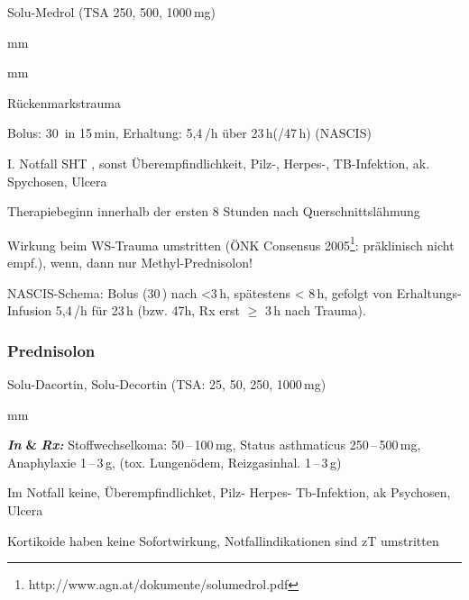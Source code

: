 Solu-Medrol (TSA 250, 500, 1000\,mg)
\begin{labeling}[:]{mm}
  \item[Beschreibung:]
  \item[In]
  \item[KI:]
  \item[Präparate:]
\end{labeling}
\begin{labeling}[:]{mm}\item[In] \item[KI] Rückenmarkstrauma

\item[Rx] Bolus: 30\, in 15\,min, Erhaltung:
5,4\,/h über 23\,h(/47\,h) (NASCIS)

\item[KI]  I. Notfall SHT%
, sonst Überempfindlichkeit, Pilz-, Herpes-, TB-Infektion, ak.
Spychosen, Ulcera

Therapiebeginn innerhalb der ersten 8 Stunden nach Querschnittslähmung


Wirkung beim WS-Trauma umstritten (ÖNK Consensus
2005\footnote{http://www.agn.at/dokumente/solumedrol.pdf}:  präklinisch nicht
empf.), wenn, dann nur Methyl-Prednisolon!

NASCIS-Schema: Bolus (30\,) nach {\textless}3\,h, spätestens
{\textless} 8\,h, gefolgt von Erhaltungs-Infusion 5,4\,/h für
23\,h (bzw. 47h, Rx erst ${\geq}$ 3\,h nach Trauma).


\end{labeling}

\subsubsection{Prednisolon}

Solu-Dacortin, Solu-Decortin (TSA: 25, 50, 250, 1000\,mg)
\begin{labeling}[:]{mm}
  \item[Beschreibung:]
  \item[In]
  \item[KI:]
  \item[Präparate:]


\textbf{\textit{\textcolor[rgb]{0.0,0.5019608,0.0}{In}}}\textbf{ \&
}\textbf{\textit{Rx:
}}\textcolor[rgb]{0.0,0.5019608,0.0}{Stoffwechselkoma:} 50\,--\,100\,mg,
\textcolor[rgb]{0.0,0.5019608,0.0}{Status asthmaticus} 250\,--\,500\,mg,
\textcolor[rgb]{0.0,0.5019608,0.0}{Anaphylaxie} 1\,--\,3\,g, (tox.
\textcolor[rgb]{0.0,0.5019608,0.0}{Lungenödem, Reizgasinhal.} 1\,--\,3\,g) 

\item[KI]  Im Notfall keine, Überempfindlichket, Pilz- Herpes- Tb-Infektion,
ak Psychosen, Ulcera

Kortikoide haben keine Sofortwirkung, Notfallindikationen sind zT
umstritten
\end{labeling}
%


